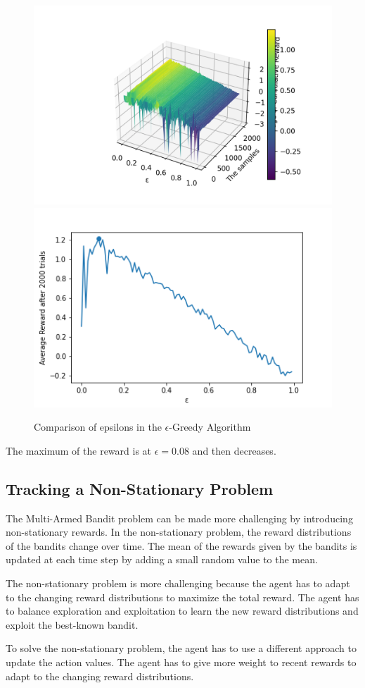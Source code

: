 \begin{figure}[h!]
    \centering
    \includegraphics[width=0.49\linewidth]{images/3d-compare-epsilon-greedy.png}
    \includegraphics[width=0.49\linewidth]{images/compare-epsilons-greedy.png}
    \caption{Comparison of epsilons in the $\epsilon$-Greedy Algorithm}
    \label{fig:epsilon_greedy_optimistic}
\end{figure}

The maximum of the reward is at $\epsilon=0.08$ and then decreases.

\subsection{Tracking a Non-Stationary Problem}

The Multi-Armed Bandit problem can be made more challenging by introducing non-stationary rewards. In the non-stationary problem, the reward distributions of the bandits change over time. The mean of the rewards given by the bandits is updated at each time step by adding a small random value to the mean.

The non-stationary problem is more challenging because the agent has to adapt to the changing reward distributions to maximize the total reward. The agent has to balance exploration and exploitation to learn the new reward distributions and exploit the best-known bandit.

To solve the non-stationary problem, the agent has to use a different approach to update the action values. The agent has to give more weight to recent rewards to adapt to the changing reward distributions.

